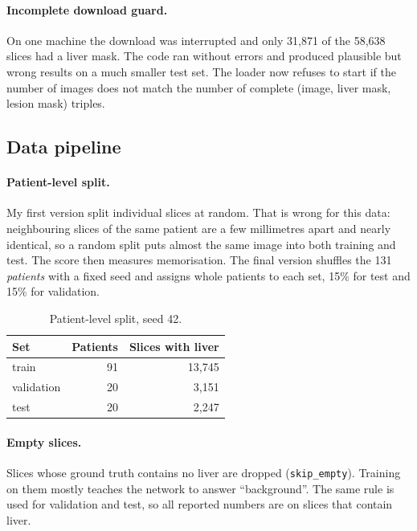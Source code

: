 \documentclass[11pt,a4paper]{article}
\newcommand{\code}[1]{\texttt{#1}}
\begin{document}
\paragraph{Incomplete download guard.} On one machine the download was
interrupted and only 31{,}871 of the 58{,}638 slices had a liver mask. The code
ran without errors and produced plausible but wrong results on a much smaller
test set. The loader now refuses to start if the number of images does not match
the number of complete (image, liver mask, lesion mask) triples.

\subsection{Data pipeline}

\paragraph{Patient-level split.} My first version split individual slices at
random. That is wrong for this data: neighbouring slices of the same patient are a
few millimetres apart and nearly identical, so a random split puts almost the same
image into both training and test. The score then measures memorisation. The
final version shuffles the 131 \emph{patients} with a fixed seed and assigns whole
patients to each set, 15\% for test and 15\% for validation.

\begin{table}[H]
\centering\small
\begin{tabular}{lrr}
\toprule
\textbf{Set} & \textbf{Patients} & \textbf{Slices with liver} \\
\midrule
train & 91 & 13{,}745 \\
validation & 20 & 3{,}151 \\
test & 20 & 2{,}247 \\
\bottomrule
\end{tabular}
\caption{Patient-level split, seed 42.}
\end{table}

\paragraph{Empty slices.} Slices whose ground truth contains no liver are
dropped (\code{skip\_empty}). Training on them mostly teaches the network to answer
``background''. The same rule is used for validation and test, so all reported
numbers are on slices that contain liver.
\end{document}
